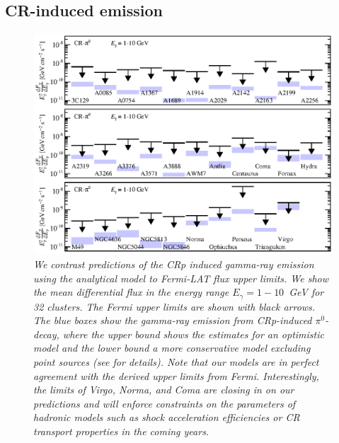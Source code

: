 \documentclass[10pt,aps,pra,reprint,amsmath,amsfonts,amssymb,showpacs,nofootinbib,floatfix]{revtex4-1}
\begin{document}
\subsection{CR-induced emission}

\begin{figure}
\begin{minipage}{2.0\columnwidth}
  \includegraphics[width=0.99\columnwidth]{figures/Fermi.comp.CR.diff.eps}
  \caption{\it We contrast predictions of the CRp induced gamma-ray
    emission using the analytical  model
    \cite{2010MNRAS.409..449P} to Fermi-LAT flux upper limits. We show
    the mean differential flux in the energy range $E_\gamma=1-10$~GeV
    for 32 clusters. The Fermi upper limits are shown with black
    arrows. The blue boxes show the gamma-ray emission from
    CRp-induced $\pi^0$-decay, where the upper bound shows the
    estimates for an optimistic model and the lower bound a more
    conservative model excluding point sources (see
    \cite{2010MNRAS.409..449P} for details). Note that our models are
    in perfect agreement with the derived upper limits from
    Fermi. Interestingly, the limits of Virgo, Norma, and Coma are
    closing in on our predictions and will enforce constraints on the
    parameters of hadronic models such as shock acceleration
    efficiencies or CR transport properties in the coming years.}
 \label{fig15}
\end{minipage}
\end{figure}
\end{document}
